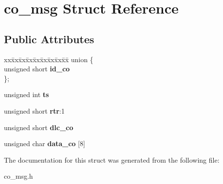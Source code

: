 \hypertarget{structco__msg}{}\section{co\+\_\+msg Struct Reference}
\label{structco__msg}
\subsection*{Public Attributes}
\begin{DoxyCompactItemize}
\item 
\mbox{\label{structco__msg_a73f2a98c9fdc837032da86b2381f9c60}} 
\begin{tabbing}
xx\=xx\=xx\=xx\=xx\=xx\=xx\=xx\=xx\=\kill
union \{\\
\>unsigned short {\bfseries id\_co}\\
\}; \\

\end{tabbing}\item 
\mbox{\label{structco__msg_aaf8cd43d17baf495c982c87866fc90b2}} 
unsigned int {\bfseries ts}
\item 
\mbox{\label{structco__msg_a4352880745fa6bc63d6c4e3c77870029}} 
unsigned short {\bfseries rtr}\+:1
\item 
\mbox{\label{structco__msg_ab19d6996baf97d346427d9789d7e4a6b}} 
unsigned short {\bfseries dlc\+\_\+co}
\item 
\mbox{\label{structco__msg_a9d398abce10852ec7e3f353258bdbe24}} 
unsigned char {\bfseries data\+\_\+co} \mbox{[}8\mbox{]}
\end{DoxyCompactItemize}


The documentation for this struct was generated from the following file\+:\begin{DoxyCompactItemize}
\item 
co\+\_\+msg.\+h\end{DoxyCompactItemize}
